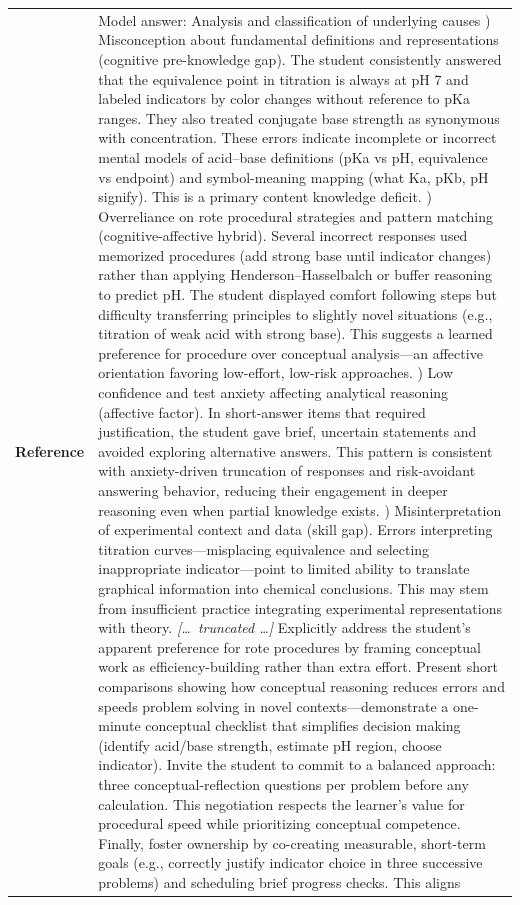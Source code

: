 \begin{longtable}{@{}l p{12.5cm}@{}}
  \textbf{Reference} & Model answer: \newline Analysis and classification of underlying causes \newline 1) Misconception about fundamental definitions and representations (cognitive pre-knowledge gap). The student consistently answered that the equivalence point in titration is always at pH 7 and labeled indicators by color changes without reference to pKa ranges. They also treated conjugate base strength as synonymous with concentration. These errors indicate incomplete or incorrect mental models of acid--base definitions (pKa vs pH, equivalence vs endpoint) and symbol-meaning mapping (what Ka, pKb, pH signify). This is a primary content knowledge deficit. \newline 2) Overreliance on rote procedural strategies and pattern matching (cognitive-affective hybrid). Several incorrect responses used memorized procedures (add strong base until indicator changes) rather than applying Henderson--Hasselbalch or buffer reasoning to predict pH. The student displayed comfort following steps but difficulty transferring principles to slightly novel situations (e.g., titration of weak acid with strong base). This suggests a learned preference for procedure over conceptual analysis---an affective orientation favoring low-effort, low-risk approaches. \newline 3) Low confidence and test anxiety affecting analytical reasoning (affective factor). In short-answer items that required justification, the student gave brief, uncertain statements and avoided exploring alternative answers. This pattern is consistent with anxiety-driven truncation of responses and risk-avoidant answering behavior, reducing their engagement in deeper reasoning even when partial knowledge exists. \newline 4) Misinterpretation of experimental context and data (skill gap). Errors interpreting titration curves---misplacing equivalence and selecting inappropriate indicator---point to limited ability to translate graphical information into chemical conclusions. This may stem from insufficient practice integrating experimental representations with theory. \newline \textit{[\ldots\ truncated \ldots]} \newline Explicitly address the student's apparent preference for rote procedures by framing conceptual work as efficiency-building rather than extra effort. Present short comparisons showing how conceptual reasoning reduces errors and speeds problem solving in novel contexts---demonstrate a one-minute conceptual checklist that simplifies decision making (identify acid/base strength, estimate pH region, choose indicator). Invite the student to commit to a balanced approach: three conceptual-reflection questions per problem before any calculation. This negotiation respects the learner's value for procedural speed while prioritizing conceptual competence. \newline Finally, foster ownership by co-creating measurable, short-term goals (e.g., correctly justify indicator choice in three successive problems) and scheduling brief progress checks. This aligns 
\end{longtable}

